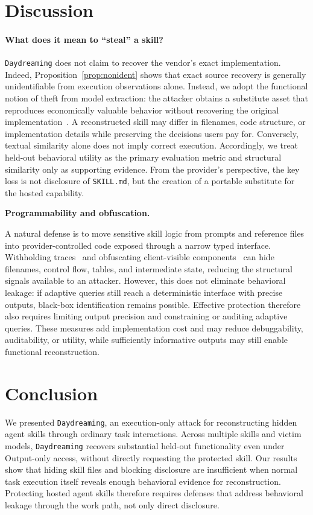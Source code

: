 \documentclass[letterpaper,twocolumn,10pt]{article}
\newcommand{\method}{\texttt{Daydreaming}\xspace}
\newcommand{\paragraphtitle}[1]{%
  \vspace{5pt}\noindent\textbf{#1.}%
}
\begin{document}
\section{Discussion}
\vspace{-5pt}
\paragraph{What does it mean to ``steal'' a skill?}
\method does not claim to recover the vendor's exact implementation.
Indeed, Proposition~\ref{prop:nonident} shows that exact source recovery is
generally unidentifiable from execution observations alone. Instead, we adopt
the functional notion of theft from model extraction: the attacker obtains a
substitute asset that reproduces economically valuable behavior without
recovering the original implementation~\cite{tramer2016stealing}. A
reconstructed skill may differ in filenames, code structure, or implementation
details while preserving the decisions users pay for. Conversely, textual
similarity alone does not imply correct execution. Accordingly, we treat
held-out behavioral utility as the primary evaluation metric and structural
similarity only as supporting evidence. From the provider's perspective, the
key loss is not disclosure of \texttt{SKILL.md}, but the creation of a
portable substitute for the hosted capability.


\paragraphtitle{Programmability and obfuscation}
A natural defense is to move sensitive skill logic from prompts and reference
files into provider-controlled code exposed through a narrow typed interface.
Withholding traces~\cite{xu2026redact} and obfuscating client-visible
components~\cite{pape2025obfuscation} can hide filenames, control flow, tables,
and intermediate state, reducing the structural signals available to an
attacker. However, this does not eliminate behavioral leakage: if adaptive
queries still reach a deterministic interface with precise outputs, black-box
identification remains possible. Effective protection therefore also requires
limiting output precision and constraining or auditing adaptive queries. These
measures add implementation cost and may reduce debuggability, auditability,
or utility, while sufficiently informative outputs may still enable functional
reconstruction.
\section{Conclusion}
We presented \method, an execution-only attack for reconstructing hidden agent skills through ordinary task interactions. Across multiple skills and victim models, \method recovers substantial held-out functionality even under Output-only access, without directly requesting the protected skill. Our results show that hiding skill files and blocking disclosure are insufficient when normal task execution itself reveals enough behavioral evidence for reconstruction. Protecting hosted agent skills therefore requires defenses that address behavioral leakage through the work path, not only direct disclosure.
\FloatBarrier
\end{document}
